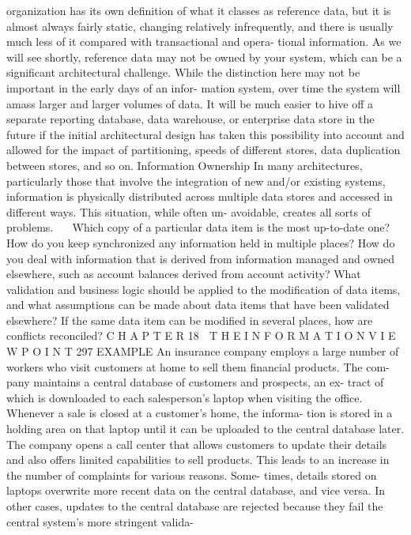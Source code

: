 organization has its own definition of what it classes as reference data,
but it is almost always fairly static, changing relatively infrequently, and
there is usually much less of it compared with transactional and opera-
tional information. As we will see shortly, reference data may not be
owned by your system, which can be a significant architectural challenge.
While the distinction here may not be important in the early days of an infor-
mation system, over time the system will amass larger and larger volumes of data.
It will be much easier to hive off a separate reporting database, data warehouse,
or enterprise data store in the future if the initial architectural design has taken
this possibility into account and allowed for the impact of partitioning, speeds of
different stores, data duplication between stores, and so on.
Information Ownership
In many architectures, particularly those that involve the integration of new
and/or existing systems, information is physically distributed across multiple
data stores and accessed in different ways. This situation, while often un-
avoidable, creates all sorts of problems.
Which copy of a particular data item is the most up-to-date one?
How do you keep synchronized any information held in multiple places?
How do you deal with information that is derived from information
managed and owned elsewhere, such as account balances derived from
account activity?
What validation and business logic should be applied to the modification
of data items, and what assumptions can be made about data items that
have been validated elsewhere?
If the same data item can be modified in several places, how are conflicts
reconciled?
C H A P T E R 18  T H E I N F O R M A T I O N V I E W P O I N T
 297
EXAMPLE An insurance company employs a large number of workers
who visit customers at home to sell them financial products. The com-
pany maintains a central database of customers and prospects, an ex-
tract of which is downloaded to each salesperson’s laptop when visiting
the office. Whenever a sale is closed at a customer’s home, the informa-
tion is stored in a holding area on that laptop until it can be uploaded to
the central database later.
The company opens a call center that allows customers to update their
details and also offers limited capabilities to sell products. This leads to
an increase in the number of complaints for various reasons. Some-
times, details stored on laptops overwrite more recent data on the central
database, and vice versa. In other cases, updates to the central database
are rejected because they fail the central system’s more stringent valida-

